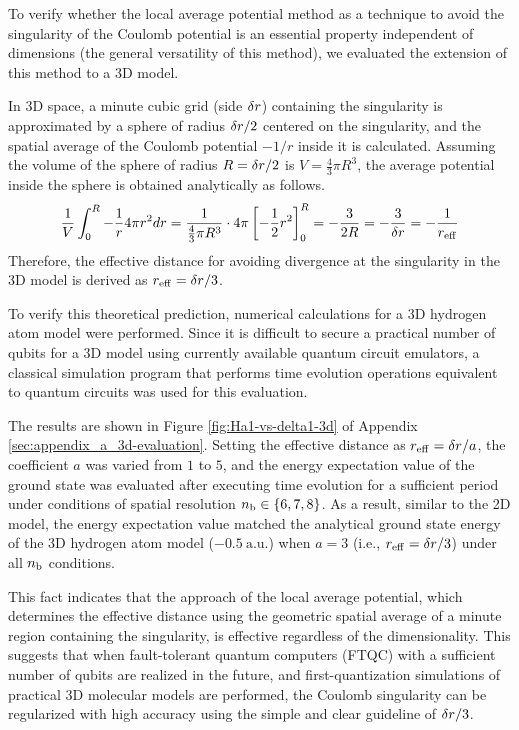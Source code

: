 \documentclass[wabun2025.tex]{subfiles}
\begin{document}
To verify whether the local average potential method as a technique to avoid the
singularity of the Coulomb potential is an essential property independent of
dimensions (the general versatility of this method), we evaluated the extension
of this method to a 3D model.

In 3D space, a minute cubic grid (side $\delta r$) containing the singularity is
approximated by a sphere of radius $\delta r/2$ centered on the singularity, and
the spatial average of the Coulomb potential $-1/r$ inside it is calculated.
Assuming the volume of the sphere of radius $R = \delta r/2$ is $V =
\frac{4}{3}\pi R^3$, the average potential inside the sphere is obtained
analytically as follows.
\begin{equation}
    \frac{1}{V} \int_{0}^{R} -\frac{1}{r} 4\pi r^2 dr 
    = \frac{1}{\frac{4}{3}\pi R^3} \cdot 4\pi
      \left[ -\frac{1}{2}r^2 \right]_{0}^{R} 
    = -\frac{3}{2R} = -\frac{3}{\delta r}=-\frac{1}{r_{\mathrm{eff}}}
\end{equation}
Therefore, the effective distance for avoiding divergence at the singularity in
the 3D model is derived as $r_{\mathrm{eff}} = \delta r/3$.

To verify this theoretical prediction, numerical calculations for a 3D hydrogen
atom model were performed. Since it is difficult to secure a practical number of
qubits for a 3D model using currently available quantum circuit emulators, a
classical simulation program that performs time evolution operations equivalent
to quantum circuits was used for this evaluation.

The results are shown in Figure \ref{fig:Ha1-vs-delta1-3d} of Appendix
\ref{sec:appendix_a_3d-evaluation}. Setting the effective distance as
$r_{\mathrm{eff}} = \delta r/a$, the coefficient $a$ was varied from $1$ to $5$,
and the energy expectation value of the ground state was evaluated after
executing time evolution for a sufficient period under conditions of spatial
resolution $n_{\mathrm{b}} \in \{6, 7, 8\}$. As a result, similar to the 2D model, the
energy expectation value matched the analytical ground state energy of the 3D
hydrogen atom model ($-0.5\ \mathrm{a.u.}$) when $a=3$ (i.e., $r_{\mathrm{eff}}
= \delta r/3$) under all $n_{\mathrm{b}}$ conditions.

This fact indicates that the approach of the local average potential, which
determines the effective distance using the geometric spatial average of a minute
region containing the singularity, is effective regardless of the
dimensionality. This suggests that when fault-tolerant quantum computers (FTQC)
with a sufficient number of qubits are realized in the future, and
first-quantization simulations of practical 3D molecular models are performed,
the Coulomb singularity can be regularized with high accuracy using the simple
and clear guideline of $\delta r/3$.
\end{document}
